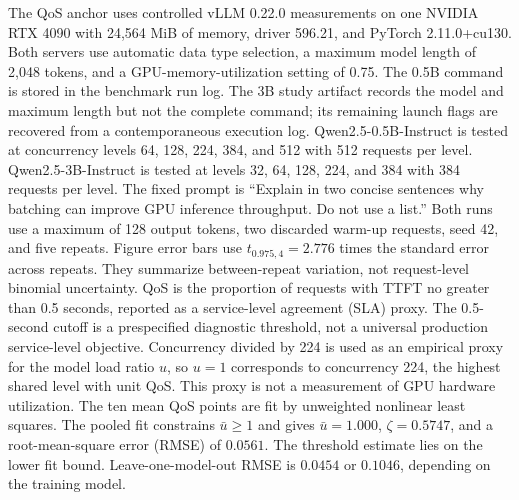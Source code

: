 \documentclass[11pt,a4paper]{article}
\begin{document}
The QoS anchor uses controlled vLLM 0.22.0 measurements on one NVIDIA RTX 4090 with 24,564 MiB of memory, driver 596.21, and PyTorch 2.11.0+cu130. Both servers use automatic data type selection, a maximum model length of 2,048 tokens, and a GPU-memory-utilization setting of 0.75. The 0.5B command is stored in the benchmark run log. The 3B study artifact records the model and maximum length but not the complete command; its remaining launch flags are recovered from a contemporaneous execution log. Qwen2.5-0.5B-Instruct is tested at concurrency levels 64, 128, 224, 384, and 512 with 512 requests per level. Qwen2.5-3B-Instruct is tested at levels 32, 64, 128, 224, and 384 with 384 requests per level. The fixed prompt is ``Explain in two concise sentences why batching can improve GPU inference throughput. Do not use a list.'' Both runs use a maximum of 128 output tokens, two discarded warm-up requests, seed 42, and five repeats. Figure error bars use $t_{0.975,4}=2.776$ times the standard error across repeats. They summarize between-repeat variation, not request-level binomial uncertainty. QoS is the proportion of requests with TTFT no greater than 0.5 seconds, reported as a service-level agreement (SLA) proxy. The 0.5-second cutoff is a prespecified diagnostic threshold, not a universal production service-level objective. Concurrency divided by 224 is used as an empirical proxy for the model load ratio $u$, so $u=1$ corresponds to concurrency 224, the highest shared level with unit QoS. This proxy is not a measurement of GPU hardware utilization. The ten mean QoS points are fit by unweighted nonlinear least squares. The pooled fit constrains $\bar u\ge1$ and gives $\bar u=1.000$, $\zeta=0.5747$, and a root-mean-square error (RMSE) of $0.0561$. The threshold estimate lies on the lower fit bound. Leave-one-model-out RMSE is $0.0454$ or $0.1046$, depending on the training model.
\end{document}
